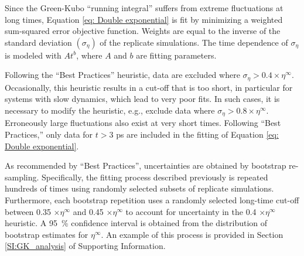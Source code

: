 \documentclass[preprint,review,12pt]{elsarticle}
\begin{document}
	
	Since the Green-Kubo ``running integral'' suffers from extreme fluctuations at long times, Equation \ref{eq: Double exponential} is fit by minimizing a weighted sum-squared error objective function. Weights are equal to the inverse of the standard deviation $(\sigma_{\eta})$ of the replicate simulations. The time dependence of $\sigma_{\eta}$ is modeled with $A t^{b}$, where $A$ and $b$ are fitting parameters.
	
	Following the ``Best Practices'' heuristic, data are excluded where $\sigma_{\eta} > 0.4 \times \eta^{\infty}$. Occasionally, this heuristic results in a cut-off that is too short, in particular for systems with slow dynamics, which lead to very poor fits. In such cases, it is necessary to modify the heuristic, e.g., exclude data where $\sigma_{\eta} > 0.8 \times \eta^{\infty}$. Erroneously large fluctuations also exist at very short times. Following ``Best Practices,'' only data for $t > 3$ ps are included in the fitting of Equation \ref{eq: Double exponential}. 
	 
	
	As recommended by ``Best Practices'', uncertainties are obtained by bootstrap re-sampling. Specifically, the fitting process described previously is repeated hundreds of times using randomly selected subsets of replicate simulations. Furthermore, each bootstrap repetition uses a randomly selected long-time cut-off between 0.35 $\times \eta^{\infty}$ and 0.45 $\times \eta^{\infty}$ to account for uncertainty in the 0.4 $\times \eta^{\infty}$ heuristic. A 95~\% confidence interval is obtained from the distribution of bootstrap estimates for $\eta^\infty$. An example of this process is provided in Section \ref{SI:GK_analysis} of Supporting Information.
	
\end{document}
